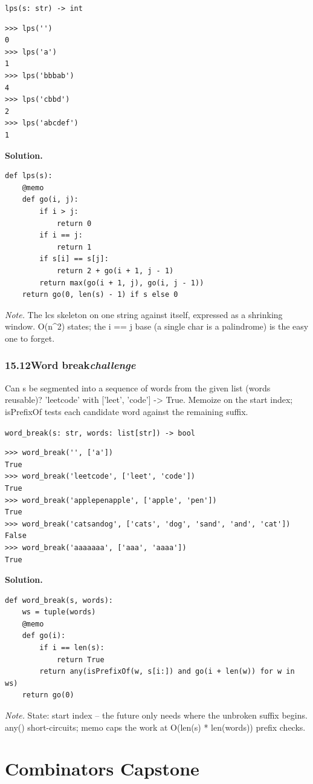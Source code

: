 \documentclass[10pt,letterpaper]{book}
\begin{document}
\noindent\texttt{lps(s: str) -> int}
\begin{lstlisting}[style=ex]
>>> lps('')
0
>>> lps('a')
1
>>> lps('bbbab')
4
>>> lps('cbbd')
2
>>> lps('abcdef')
1
\end{lstlisting}
\noindent\textbf{Solution.}
\begin{lstlisting}[style=code]
def lps(s):
    @memo
    def go(i, j):
        if i > j:
            return 0
        if i == j:
            return 1
        if s[i] == s[j]:
            return 2 + go(i + 1, j - 1)
        return max(go(i + 1, j), go(i, j - 1))
    return go(0, len(s) - 1) if s else 0
\end{lstlisting}
\noindent\textit{Note.} The lcs skeleton on one string against itself, expressed as a shrinking window. O(n\^{}2) states; the i == j base (a single char is a palindrome) is the easy one to forget.

\subsection*{15.12\quad Word break\hfill\textnormal{\textit{challenge}}}
Can s be segmented into a sequence of words from the given list (words reusable)? 'leetcode' with ['leet', 'code'] -> True. Memoize on the start index; isPrefixOf tests each candidate word against the remaining suffix.

\noindent\texttt{word\_break(s: str, words: list[str]) -> bool}
\begin{lstlisting}[style=ex]
>>> word_break('', ['a'])
True
>>> word_break('leetcode', ['leet', 'code'])
True
>>> word_break('applepenapple', ['apple', 'pen'])
True
>>> word_break('catsandog', ['cats', 'dog', 'sand', 'and', 'cat'])
False
>>> word_break('aaaaaaa', ['aaa', 'aaaa'])
True
\end{lstlisting}
\noindent\textbf{Solution.}
\begin{lstlisting}[style=code]
def word_break(s, words):
    ws = tuple(words)
    @memo
    def go(i):
        if i == len(s):
            return True
        return any(isPrefixOf(w, s[i:]) and go(i + len(w)) for w in ws)
    return go(0)
\end{lstlisting}
\noindent\textit{Note.} State: start index -- the future only needs where the unbroken suffix begins. any() short-circuits; memo caps the work at O(len(s) * len(words)) prefix checks.

\clearpage
\chapter{Combinators Capstone}
\end{document}
